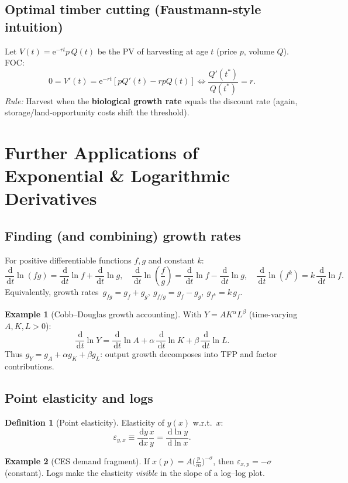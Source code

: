 \documentclass[12pt]{article}
\newcommand{\dd}{\,\mathrm{d}}
\newcommand{\e}{\mathrm{e}}
\newcommand{\1}{\mathbf{1}}
\theoremstyle{definition}
\newtheorem{definition}{Definition}
\newtheorem{example}{Example}
\theoremstyle{plain}
\begin{document}
\subsection*{Optimal timber cutting (Faustmann-style intuition)}
Let \(V(t)=\e^{-rt}p\,Q(t)\) be the PV of harvesting at age \(t\) (price \(p\), volume \(Q\)). FOC:
\[
0=V'(t)=\e^{-rt}\!\left[pQ'(t)-rpQ(t)\right]\iff \frac{Q'(t^\ast)}{Q(t^\ast)}=r.
\]
\emph{Rule:} Harvest when the \textbf{biological growth rate} equals the discount rate (again, storage/land-opportunity costs shift the threshold).

\section{Further Applications of Exponential \& Logarithmic Derivatives}
\subsection*{Finding (and combining) growth rates}
For positive differentiable functions \(f,g\) and constant \(k\):
\[
\frac{\dd}{\dd t}\ln(fg)=\frac{\dd}{\dd t}\ln f+\frac{\dd}{\dd t}\ln g,\quad
\frac{\dd}{\dd t}\ln\!\left(\frac{f}{g}\right)=\frac{\dd}{\dd t}\ln f-\frac{\dd}{\dd t}\ln g,\quad
\frac{\dd}{\dd t}\ln(f^k)=k\,\frac{\dd}{\dd t}\ln f.
\]
Equivalently, growth rates \(\,g_{fg}=g_f+g_g,\ g_{f/g}=g_f-g_g,\ g_{f^k}=k\,g_f\).

\begin{example}[Cobb--Douglas growth accounting]
With \(Y=A K^\alpha L^\beta\) (time-varying \(A,K,L>0\)):
\[
\frac{\dd}{\dd t}\ln Y
= \frac{\dd}{\dd t}\ln A + \alpha\,\frac{\dd}{\dd t}\ln K + \beta\,\frac{\dd}{\dd t}\ln L.
\]
Thus \(g_Y=g_A+\alpha g_K+\beta g_L\): output growth decomposes into TFP and factor contributions.
\end{example}

\subsection*{Point elasticity and logs}
\begin{definition}[Point elasticity]
Elasticity of \(y(x)\) w.r.t.\ \(x\):
\[
\varepsilon_{y,x} \equiv \frac{\dd y}{\dd x}\frac{x}{y}
= \frac{\dd\ln y}{\dd\ln x}.
\]
\end{definition}
\begin{example}[CES demand fragment]
If \(x(p)=A\big(\tfrac{p}{m}\big)^{-\sigma}\), then
\(\varepsilon_{x,p}=-\sigma\) (constant). Logs make the elasticity \emph{visible} in the slope of a log--log plot.
\end{example}
\end{document}
